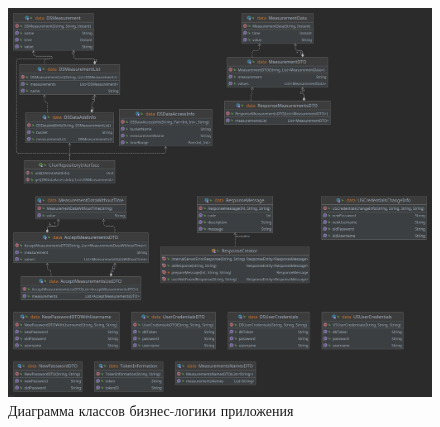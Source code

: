 \begin{figure}[hbtp]
	\centering
	\includegraphics[width=\textwidth]{img/domainLayerDiagram.png}
	\caption{Диаграмма классов бизнес-логики приложения}
	\label{fig:domainLayer}
\end{figure}

